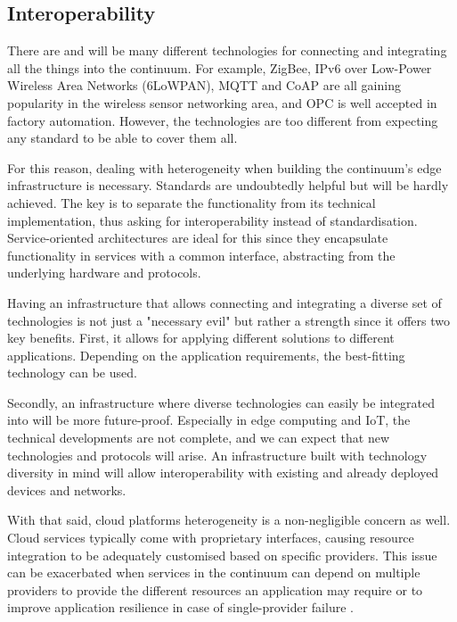 \subsection{Interoperability}
\label{sec:interoperability}

There are and will be many different technologies for connecting and integrating all the things into the continuum. For example, ZigBee, IPv6 over Low-Power Wireless Area Networks (6LoWPAN), MQTT and CoAP \cite{naik2017choice} are all gaining popularity in the wireless sensor networking area, and OPC \cite{gruner2016restful} is well accepted in factory automation. However, the technologies are too different from expecting any standard to be able to cover them all.

For this reason, dealing with heterogeneity when building the continuum's edge infrastructure is necessary. Standards are undoubtedly helpful but will be hardly achieved. The key is to separate the functionality from its technical implementation, thus asking for interoperability instead of standardisation. Service-oriented architectures are ideal for this since they encapsulate functionality in services with a common interface, abstracting from the underlying hardware and protocols.

Having an infrastructure that allows connecting and integrating a diverse set of technologies is not just a "necessary evil" but rather a strength since it offers two key benefits. First, it allows for applying different solutions to different applications. Depending on the application requirements, the best-fitting technology can be used.

Secondly, an infrastructure where diverse technologies can easily be integrated into will be more future-proof. Especially in edge computing and IoT, the technical developments are not complete, and we can expect that new technologies and protocols will arise. An infrastructure built with technology diversity in mind will allow interoperability with existing and already deployed devices and networks.

With that said, cloud platforms heterogeneity is a non-negligible concern as well. Cloud services typically come with proprietary interfaces, causing resource integration to be adequately customised based on specific providers. This issue can be exacerbated when services in the continuum can depend on multiple providers to provide the different resources an application may require or to improve application resilience in case of single-provider failure \cite{grozev2014inter}.

